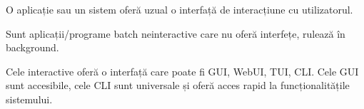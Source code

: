 %
%
%
%
%
%
%
%
%
%

O aplicație sau un sistem oferă uzual o interfață de interacțiune cu
utilizatorul.

Sunt aplicații/programe batch neinteractive care nu oferă interfețe, rulează în
background.

Cele interactive oferă o interfață care poate fi GUI, WebUI, TUI, CLI. Cele GUI
sunt accesibile, cele CLI sunt universale și oferă acces rapid la
funcționalitățile sistemului.

